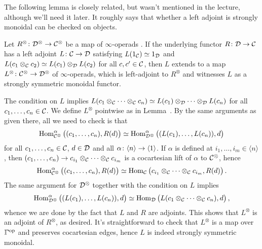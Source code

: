 The following lemma is closely related, but wasn't mentioned in the lecture, although we'll need it later. It roughly says that whether a left adjoint is strongly monoidal can be checked on objects.
\begin{lem*}\label{lem*:LeftAdjointStronglyMonoidal}
	Let $R^\otimes\colon \Dd^\otimes\morphism\Cc^\otimes$ be a map of $\infty$-operads . If the underlying functor $R\colon \Dd\morphism\Cc$ has a left adjoint $L\colon \Cc\morphism\Dd$ satisfying $L(1_{\mathcal{C}})\simeq 1_{\mathcal{D}}$ and $L(c_1\otimes_{\mathcal{C}} c_2)\simeq L(c_1)\otimes_{\mathcal{D}} L(c_2)$ for all $c,c'\in \mathcal{C}$, then $L$ extends to a map $L^\otimes\colon \Cc^\otimes\morphism \Dd^\otimes$ of $\infty$-operads, which is left-adjoint to $R^\otimes$ and witnesses $L$ as a strongly symmetric monoidal functor.
\end{lem*}
\begin{proof*}
	The condition on $L$ implies $L(c_1\otimes_{\mathcal{C}}\dotsb\otimes_{\mathcal{C}} c_n)\simeq L(c_1)\otimes_{\mathcal{D}}\dotsb\otimes_{\mathcal{D}} L(c_n)$ for all $c_1,\dotsc,c_n\in\mathcal{C}$. We define $L^\otimes$ pointwise as in Lemma~. By the same arguments as given there, all we need to check is that
	\begin{equation*}
		\operatorname{Hom}_{\mathcal{C}^\otimes}^\alpha\big((c_1,\dotsc,c_n),R(d)\big)\simeq \operatorname{Hom}_{\mathcal{D}^\otimes}^\alpha\big((L(c_1),\dotsc,L(c_n)),d\big)
	\end{equation*}
	for all $c_1,\dotsc,c_n\in\mathcal{C}$, $d\in \mathcal{D}$ and all $\alpha\colon \langle n\rangle \morphism\langle 1\rangle$. If $\alpha$ is defined at $i_1,\dotsc,i_m\in\langle n\rangle$, then $(c_1,\dotsc,c_n)\morphism c_{i_1}\otimes_\Cc\dotsb\otimes_\Cc c_{i_m}$ is a cocartesian lift of $\alpha$ to $\mathcal{C}^\otimes$, hence
	\begin{equation*}
		\operatorname{Hom}_{\mathcal{C}^\otimes}^\alpha\big((c_1,\dotsc,c_n),R(d)\big)\simeq \operatorname{Hom}_{\mathcal{C}}\big(c_{i_1}\otimes_{\mathcal{C}}\dotsb\otimes_{\mathcal{C}} c_{i_m},R(d)\big)\,.
	\end{equation*}
	The same argument for $\mathcal{D}^\otimes$ together with the condition on $L$  implies
	\begin{equation*}
		\operatorname{Hom}_{\mathcal{D}^\otimes}^\alpha\big((L(c_1),\dotsc,L(c_n)),d\big)\simeq \operatorname{Hom}_{\mathcal{D}}\big(L(c_1\otimes_{\mathcal{C}}\dotsb\otimes_{\mathcal{C}} c_n),d\big)\,,
	\end{equation*}
	whence we are done by the fact that $L$ and $R$ are adjoints. This shows that $L^\otimes$ is an adjoint of $R^\otimes$, as desired. It's straightforward to check that $L^\otimes$ is a map over $\IGamma^\op$ and preserves cocartesian edges, hence $L$ is indeed strongly symmetric monoidal.
\end{proof*}
